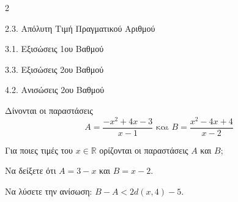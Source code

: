 \begin{ylh}{2}
    \item 2.3. Απόλυτη Τιμή Πραγματικού Αριθμού
    \item 3.1. Εξισώσεις 1ου Βαθμού
    \item 3.3. Εξισώσεις 2ου Βαθμού
    \item 4.2. Ανισώσεις 2ου Βαθμού
\end{ylh}
Δίνονται οι παραστάσεις \[A = \dfrac{-x^2+4x-3}{x-1} \text{ και } B = \dfrac{x^2-4x+4}{x-2}\]
\begin{alist}
\item Για ποιες τιμές του $x \in \mathbb{R}$ ορίζονται οι παραστάσεις $A$ και $B$;

\item Να δείξετε ότι $A = 3 - x$ και $B = x - 2$.
\item Να λύσετε την ανίσωση: $B - A < 2d(x, 4) - 5$.
\end{alist}

